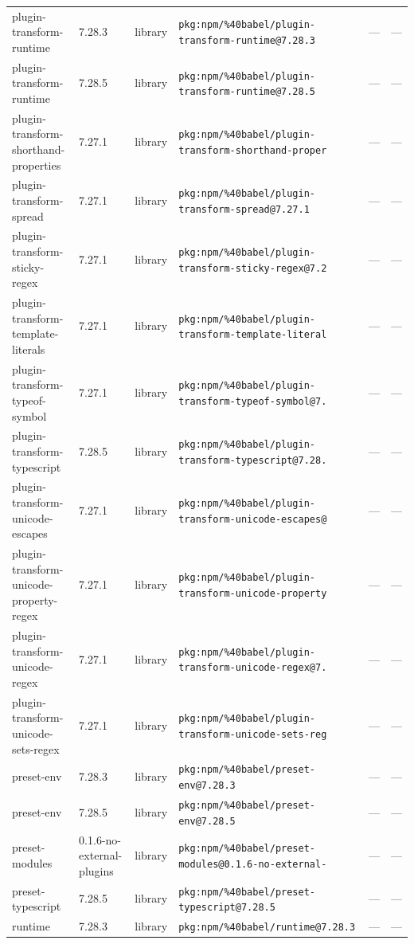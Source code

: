 \documentclass[11pt]{article}
\begin{document}
\begin{longtable}{|l|l|l|p{2.2cm}|l|p{4cm}|}
plugin-transform-runtime & 7.28.3 & library & \texttt{pkg:npm/\%40babel/plugin-transform-runtime@7.28.3} & — & — \\
plugin-transform-runtime & 7.28.5 & library & \texttt{pkg:npm/\%40babel/plugin-transform-runtime@7.28.5} & — & — \\
plugin-transform-shorthand-properties & 7.27.1 & library & \texttt{pkg:npm/\%40babel/plugin-transform-shorthand-proper} & — & — \\
plugin-transform-spread & 7.27.1 & library & \texttt{pkg:npm/\%40babel/plugin-transform-spread@7.27.1} & — & — \\
plugin-transform-sticky-regex & 7.27.1 & library & \texttt{pkg:npm/\%40babel/plugin-transform-sticky-regex@7.2} & — & — \\
plugin-transform-template-literals & 7.27.1 & library & \texttt{pkg:npm/\%40babel/plugin-transform-template-literal} & — & — \\
plugin-transform-typeof-symbol & 7.27.1 & library & \texttt{pkg:npm/\%40babel/plugin-transform-typeof-symbol@7.} & — & — \\
plugin-transform-typescript & 7.28.5 & library & \texttt{pkg:npm/\%40babel/plugin-transform-typescript@7.28.} & — & — \\
plugin-transform-unicode-escapes & 7.27.1 & library & \texttt{pkg:npm/\%40babel/plugin-transform-unicode-escapes@} & — & — \\
plugin-transform-unicode-property-regex & 7.27.1 & library & \texttt{pkg:npm/\%40babel/plugin-transform-unicode-property} & — & — \\
plugin-transform-unicode-regex & 7.27.1 & library & \texttt{pkg:npm/\%40babel/plugin-transform-unicode-regex@7.} & — & — \\
plugin-transform-unicode-sets-regex & 7.27.1 & library & \texttt{pkg:npm/\%40babel/plugin-transform-unicode-sets-reg} & — & — \\
preset-env & 7.28.3 & library & \texttt{pkg:npm/\%40babel/preset-env@7.28.3} & — & — \\
preset-env & 7.28.5 & library & \texttt{pkg:npm/\%40babel/preset-env@7.28.5} & — & — \\
preset-modules & 0.1.6-no-external-plugins & library & \texttt{pkg:npm/\%40babel/preset-modules@0.1.6-no-external-} & — & — \\
preset-typescript & 7.28.5 & library & \texttt{pkg:npm/\%40babel/preset-typescript@7.28.5} & — & — \\
runtime & 7.28.3 & library & \texttt{pkg:npm/\%40babel/runtime@7.28.3} & — & — \\

\end{longtable}
\end{document}
